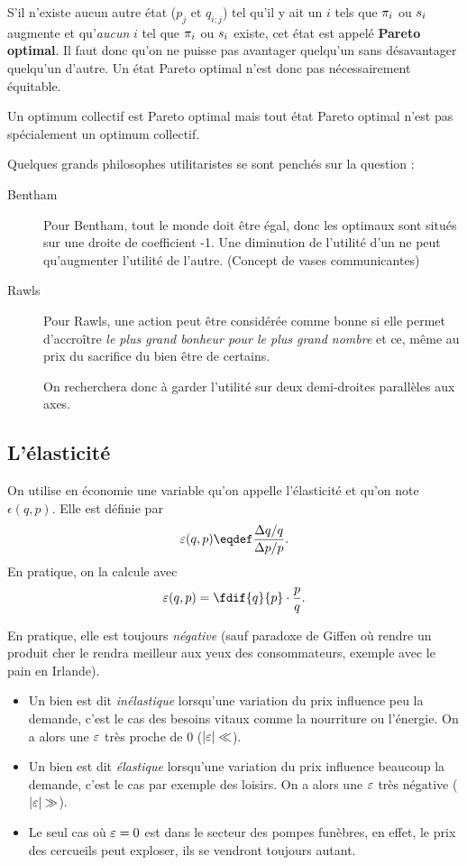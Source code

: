 S'il n'existe aucun autre état ($p_j$ et $q_{i;j}$)
tel qu'il y ait un $i$ tels que $\pi_i$ ou $s_i$ augmente et
qu'\emph{aucun} $i$ tel que $\pi_i$ ou $s_i$ existe,
cet état est appelé \textbf{Pareto optimal}.
Il faut donc qu'on ne puisse pas avantager quelqu'un sans désavantager
quelqu'un d'autre.
Un état Pareto optimal n'est donc pas nécessairement équitable.

Un optimum collectif est Pareto optimal mais tout état Pareto optimal
n'est pas spécialement un optimum collectif.

Quelques grands philosophes utilitaristes se sont penchés sur la question :
\begin{description}
  \item[Bentham]
	Pour Bentham, tout le monde doit être égal, donc les optimaux sont
	situés sur une droite de coefficient -1. Une diminution de l'utilité d'un ne
	peut qu'augmenter l'utilité de l'autre. (Concept de vases communicantes)    
  \item[Rawls]
	Pour Rawls, une action peut être considérée comme bonne si elle 
	permet d’accroître \emph{le plus grand bonheur pour le plus
	grand nombre} et ce, même au prix du sacrifice du bien être de certains.
	
	On recherchera donc à garder l'utilité sur deux demi-droites parallèles
	aux axes.
\end{description}

\subsection{L'élasticité}
On utilise en économie une variable qu'on appelle l'élasticité et qu'on note
$\epsilon(q,p)$. Elle est définie par
\begin{equation}
  \label{eq:elasticity}
  \elasticity(q,p) \eqdef \frac{\Delta q/q}{\Delta p/p}.
\end{equation}
En pratique, on la calcule avec
\[ \elasticity(q,p) = \fdif{q}{p}\cdot \frac{p}{q}. \]

En pratique, elle est toujours \emph{négative}
(sauf paradoxe de Giffen où rendre un produit cher le rendra meilleur aux yeux
des consommateurs, exemple avec le pain en Irlande).

\begin{itemize}
  \item Un bien est dit \emph{inélastique} lorsqu'une variation du prix
    influence peu la demande, c'est le cas des besoins vitaux comme la
    nourriture ou l'énergie. On a alors une $\varepsilon$ très proche de 0
    ($|\varepsilon| \ll$).
  \item Un bien est dit \emph{élastique} lorsqu'une variation du prix
    influence beaucoup la demande, c'est le cas par exemple des loisirs.
    On a alors une $\varepsilon$ très négative ($|\varepsilon| \gg$).
  \item Le seul cas où $\varepsilon = 0$ est dans le secteur des pompes
   funèbres, en effet, le prix des cercueils peut exploser,
   ils se vendront toujours autant.
\end{itemize}

